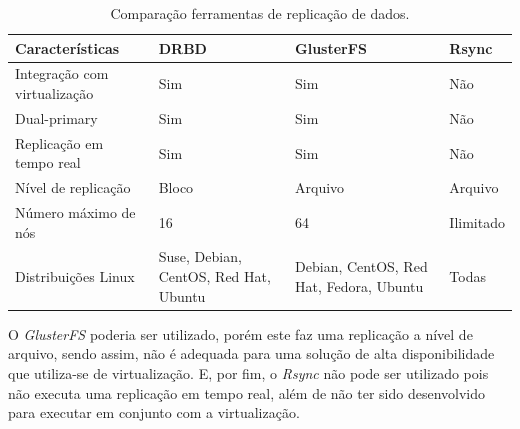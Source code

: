 \begin{table}[h!]
\caption{Comparação ferramentas de replicação de dados.}
\label{tab:replicacao}
\begin{center}
\begin{tabular}{|l|p{3.5cm}|p{3.5cm}|p{2cm}|}\hline
\textbf{Características} & \textbf{DRBD} & \textbf{GlusterFS} & \textbf{Rsync} \\\hline
Integração com virtualização & Sim & Sim & Não \\\hline
Dual-primary & Sim & Sim & Não \\\hline
Replicação em tempo real & Sim & Sim & Não \\\hline
Nível de replicação & Bloco & Arquivo & Arquivo \\\hline
Número máximo de nós & 16 & 64 & Ilimitado \\\hline
Distribuições Linux & Suse, Debian, CentOS, Red Hat, Ubuntu & Debian, CentOS, Red Hat, Fedora, Ubuntu & Todas \\\hline
\end{tabular}
\end{center}
\end{table}

O \textit{GlusterFS} poderia ser utilizado, porém este faz uma replicação a nível de arquivo, sendo assim, não é adequada para uma 
solução de alta disponibilidade que utiliza-se de virtualização. 
E, por fim, o \textit{Rsync} não pode ser utilizado pois não executa uma replicação em tempo real, além de não ter sido desenvolvido para
executar em conjunto com a virtualização.






